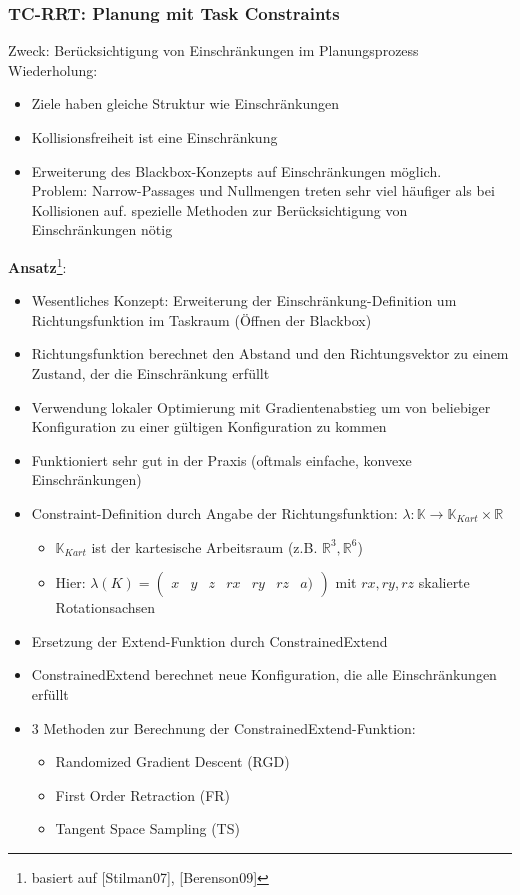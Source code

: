 \subsubsection*{TC-RRT: Planung mit Task Constraints}
Zweck: Berücksichtigung von Einschränkungen im Planungsprozess\\
Wiederholung:
\begin{itemize}
\item Ziele haben gleiche Struktur wie Einschränkungen
\item Kollisionsfreiheit ist eine Einschränkung
\item Erweiterung des Blackbox-Konzepts auf Einschränkungen möglich.\\
Problem: Narrow-Passages und Nullmengen treten sehr viel häufiger als bei Kollisionen auf.
\ita spezielle Methoden zur Berücksichtigung von Einschränkungen nötig
\end{itemize}
\textbf{Ansatz}\footnote{basiert auf [Stilman07], [Berenson09]}:
\begin{itemize}
\item Wesentliches Konzept: Erweiterung der Einschränkung-Definition um Richtungsfunktion im Taskraum (\glqq Öffnen der Blackbox\grqq)
\item Richtungsfunktion berechnet den Abstand und den Richtungsvektor zu einem Zustand, der die Einschränkung erfüllt
\item Verwendung lokaler Optimierung mit Gradientenabstieg um von beliebiger Konfiguration zu einer gültigen Konfiguration zu kommen
\item Funktioniert sehr gut in der Praxis (oftmals einfache, konvexe Einschränkungen)
\item Constraint-Definition durch Angabe der Richtungsfunktion: $\lambda : \mathbb{K} \rightarrow \mathbb{K}_{Kart} \times \mathbb{R}$
\begin{itemize}
\item $\mathbb{K}_{Kart}$ ist der kartesische Arbeitsraum (z.B. $\mathbb{R}^3, \mathbb{R}^6$)
\item Hier: $\lambda(K) = \begin{pmatrix}x &y& z& rx& ry& rz& a)\end{pmatrix}$ mit $rx, ry, rz$ skalierte Rotationsachsen
\end{itemize}
\item Ersetzung der Extend-Funktion durch ConstrainedExtend
\item ConstrainedExtend berechnet neue Konfiguration, die alle Einschränkungen erfüllt
\item 3 Methoden zur Berechnung der ConstrainedExtend-Funktion:
\begin{itemize}
\item Randomized Gradient Descent (RGD)
\item First Order Retraction (FR)
\item Tangent Space Sampling (TS)
\end{itemize}
\end{itemize}
